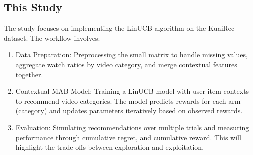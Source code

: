 



\subsection{This Study}

The study focuses on implementing the LinUCB algorithm on the KuaiRec dataset. The workflow involves:

\begin{enumerate}
    \item Data Preparation: Preprocessing the small matrix to handle missing values, aggregate watch ratios by video category, and merge contextual features together.
    \item Contextual MAB Model: Training a LinUCB model with user-item contexts to recommend video categories. The model predicts rewards for each arm (category) and updates parameters iteratively based on observed rewards.
    \item Evaluation: Simulating recommendations over multiple trials and measuring performance through cumulative regret, and cumulative reward. This will highlight the trade-offs between exploration and exploitation.
\end{enumerate}

